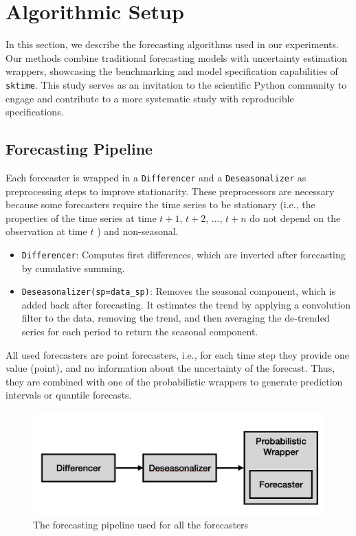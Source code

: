 \section{Algorithmic Setup} \label{methods}

In this section, we describe the forecasting algorithms used in our experiments. Our methods combine traditional forecasting models with uncertainty estimation wrappers, showcasing the benchmarking and model specification capabilities of \texttt{sktime}. This study serves as an invitation to the scientific Python community to engage and contribute to a more systematic study with reproducible specifications.

\subsection{Forecasting Pipeline}
Each forecaster is wrapped in a \texttt{Differencer} and a \texttt{Deseasonalizer} as preprocessing steps to improve stationarity. These preprocessors are necessary because some forecasters require the time series to be stationary (i.e., the properties of the time series at time $t+1$, $t+2$, ..., $t+n$ do not depend on the observation at time $t$ \citep{hyndman2018}) and non-seasonal.

\begin{itemize}
    \item \texttt{Differencer}: Computes first differences, which are inverted after forecasting by cumulative summing.
    \item \texttt{Deseasonalizer(sp=data\_sp)}: Removes the seasonal component, which is added back after forecasting. It estimates the trend by applying a convolution filter to the data, removing the trend, and then averaging the de-trended series for each period to return the seasonal component.
\end{itemize}

All used forecasters are point forecasters, i.e., for each time step they provide one value (point), and no information about the uncertainty of the forecast. Thus, they are combined with one of the probabilistic wrappers to generate prediction intervals or quantile forecasts.

\begin{figure}
    \centering
    \includegraphics[width=\textwidth]{Figures/Pipeline.png}
    \caption{The forecasting pipeline used for all the forecasters}
    \label{fig:pipeline}
\end{figure}

